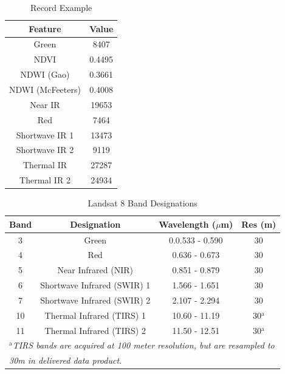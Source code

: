 \documentclass[conference]{IEEEtran}
\begin{document}
\begin{table}[t]
\caption{Record Example}
\label{record}
\begin{center}
\begin{tabular}{|c|c|}
\hline
\textbf{Feature} & \textbf{Value}\\
\hline
Green			&	8407		\\
\hline
NDVI			&	0.4495	\\
\hline
NDWI (Gao)		&	0.3661	\\
\hline
NDWI (McFeeters)	&	0.4008	\\
\hline
Near IR			&	19653	\\
\hline
Red				&	7464		\\
\hline
Shortwave IR 1		&	13473	\\
\hline
Shortwave IR 2		&	9119		\\
\hline
Thermal IR 		&	27287	\\
\hline
Thermal IR 2		&	24934	\\
\hline
\end{tabular}
\end{center}
\end{table}

\begin{table}[t]
\caption{Landsat 8 Band Designations\cite{rs61010232}}
\label{bands}
\begin{center}
\begin{tabular}{|c|c|c|c|}
\hline
\textbf{Band} & \textbf{Designation} & \textbf{Wavelength ($\mu$m)}& \textbf{Res (m)} \\
\hline
3 & Green & 0.0.533 - 0.590 & 30\\
\hline
4 & Red & 0.636 - 0.673 & 30\\
\hline
5 & Near Infrared (NIR) & 0.851 - 0.879 & 30\\
\hline
6 & Shortwave Infrared (SWIR) 1 & 1.566 - 1.651 & 30\\
\hline
7 & Shortwave Infrared (SWIR) 2 & 2.107 - 2.294 & 30\\
\hline
10 & Thermal Infrared (TIRS) 1 & 10.60 - 11.19 & 30$^{\mathrm{a}}$ \\
\hline
11 & Thermal Infrared (TIRS) 2 & 11.50 - 12.51 & 30$^{\mathrm{a}}$ \\
\hline
\multicolumn{4}{l}{$^{\mathrm{a}}$\textit{TIRS bands are acquired at 100 meter resolution, but are resampled to}}\\
\multicolumn{4}{l}{\textit{30m in delivered data product.}}
\end{tabular}
\label{band}
\end{center}
\end{table}
\end{document}
